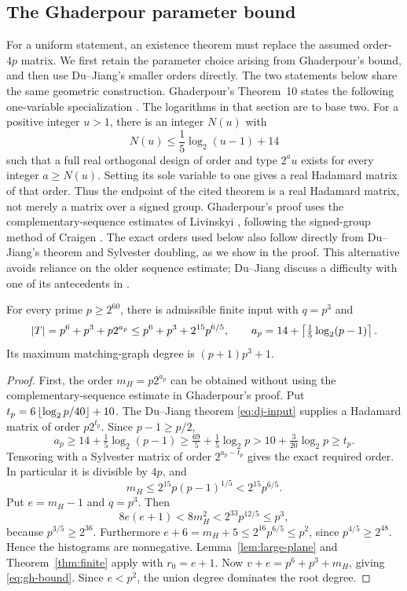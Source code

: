 \subsection{The Ghaderpour parameter bound}

For a uniform statement, an existence theorem must replace the assumed order-$4p$ matrix. We first retain the parameter choice arising from Ghaderpour's bound, and then use Du--Jiang's smaller orders directly. The two statements below share the same geometric construction.
Ghaderpour's Theorem~10 states the following one-variable specialization \cite[pp.~14--15 of the preprint]{Gh15}. The logarithms in that section are to base two. For a positive integer $u>1$, there is an integer $N(u)$ with
\[
 N(u)\le\frac15\log_2(u-1)+14
\]
such that a full real orthogonal design of order and type $2^a u$ exists for every integer $a\ge N(u)$. Setting its sole variable to one gives a real Hadamard matrix of that order. Thus the endpoint of the cited theorem is a real Hadamard matrix, not merely a matrix over a signed group. Ghaderpour's proof uses the complementary-sequence estimates of Livinskyi \cite[Chapter~5]{Liv12}, following the signed-group method of Craigen \cite{Cra95}. The exact orders used below also follow directly from Du--Jiang's theorem and Sylvester doubling, as we show in the proof. This alternative avoids reliance on the older sequence estimate; Du--Jiang discuss a difficulty with one of its antecedents in \cite[p.~2, footnote~1]{DJ24}.

\begin{theorem}\label{thm:ghaderpour}
For every prime $p\ge2^{60}$, there is admissible finite input with $q=p^3$ and
\begin{equation}\label{eq:gh-bound}
 |T|=p^6+p^3+p2^{a_p}\le p^6+p^3+2^{15}p^{6/5},
 \qquad a_p=14+\left\lceil \tfrac15\log_2(p-1)\right\rceil.
\end{equation}
Its maximum matching-graph degree is $(p+1)p^3+1$.
\end{theorem}
\begin{proof}
First, the order $m_H=p2^{a_p}$ can be obtained without using the complementary-sequence estimate in Ghaderpour's proof. Put $t_p=6\left\lfloor \log_2p/40\right\rfloor+10$. The Du--Jiang theorem \eqref{eq:dj-input} supplies a Hadamard matrix of order $p2^{t_p}$. Since $p-1\ge p/2$,
\[
 a_p\ge14+\tfrac15\log_2(p-1)
 \ge\tfrac{69}{5}+\tfrac15\log_2p
 >10+\tfrac3{20}\log_2p\ge t_p.
\]
Tensoring with a Sylvester matrix of order $2^{a_p-t_p}$ gives the exact required order. In particular it is divisible by $4p$, and
\[
 m_H\le2^{15}p(p-1)^{1/5}<2^{15}p^{6/5}.
\]
Put $e=m_H-1$ and $q=p^3$. Then
\[
 8e(e+1)<8m_H^2<2^{33}p^{12/5}\le p^3,
\]
because $p^{3/5}\ge2^{36}$. Furthermore $e+6=m_H+5\le2^{16}p^{6/5}\le p^2$, since $p^{4/5}\ge2^{48}$. Hence the histograms are nonnegative. Lemma~\ref{lem:large-plane} and Theorem~\ref{thm:finite} apply with $r_0=e+1$. Now $v+e=p^6+p^3+m_H$, giving \eqref{eq:gh-bound}. Since $e<p^2$, the union degree dominates the root degree.
\end{proof}

